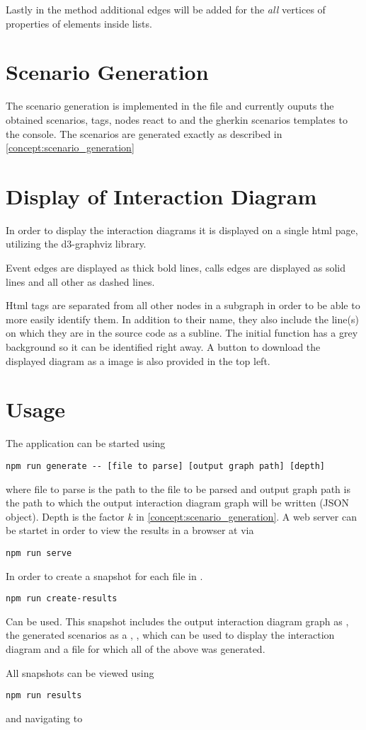 Lastly in the  method additional edges will be added for the \textit{all} vertices of properties of elements inside lists.

\section{Scenario Generation}
The scenario generation is implemented in the  file and currently ouputs the obtained scenarios, tags, nodes react to and the gherkin scenarios templates to the console. The scenarios are generated exactly as described in \ref{concept:scenario_generation}

\section{Display of Interaction Diagram}
In order to display the interaction diagrams it is displayed on a single html page, utilizing the d3-graphviz \parencite{graph_viz} library. 

Event edges are displayed as thick bold lines, calls edges are displayed as solid lines and all other as dashed lines.

Html tags are separated from all other nodes in a subgraph in order to be able to more easily identify them. In addition to their name, they also include the line(s) on which they are in the source code as a subline. The initial function has a grey background so it can be identified right away.
A button to download the displayed diagram as a  image is also provided in the top left.

\section{Usage}
The application can be started using
\begin{lstlisting}
npm run generate -- [file to parse] [output graph path] [depth]
\end{lstlisting}
where file to parse is the path to the  file to be parsed and output graph path is the path to which the output interaction diagram graph will be written (JSON object). Depth is the factor $k$ in \ref{concept:scenario_generation}.
A web server can be startet in order to view the results in a browser at  via
\begin{lstlisting}
npm run serve
\end{lstlisting}
In order to create a snapshot for each file in .
\begin{lstlisting}
npm run create-results  
\end{lstlisting}
Can be used. This snapshot includes the output interaction diagram graph as , the generated scenarios as a , , which can be used to display the interaction diagram and a  file for which all of the above was generated.

All snapshots can be viewed using
\begin{lstlisting}
npm run results 
\end{lstlisting}
and navigating to 